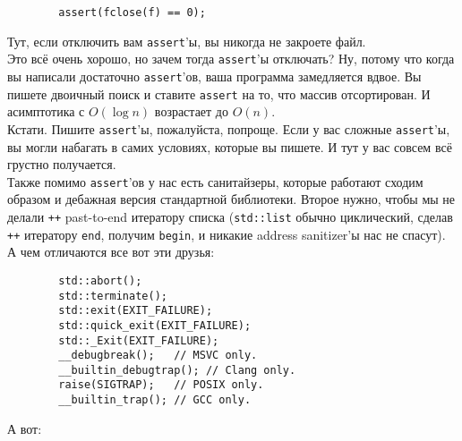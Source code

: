 \documentclass{article}
\begin{document}
    \begin{verbatim}
        assert(fclose(f) == 0);
    \end{verbatim}
    Тут, если отключить вам \texttt{assert}'ы, вы никогда не закроете файл.\\
    Это всё очень хорошо, но зачем тогда \texttt{assert}'ы отключать? Ну, потому что когда вы написали достаточно \texttt{assert}'ов, ваша программа замедляется вдвое. Вы пишете двоичный поиск и ставите \texttt{assert} на то, что массив отсортирован. И асимптотика с $O(\log n)$ возрастает до $O(n)$.\\
    Кстати. Пишите \texttt{assert}'ы, пожалуйста, попроще. Если у вас сложные \texttt{assert}'ы, вы могли набагать в самих условиях, которые вы пишете. И тут у вас совсем всё грустно получается.\\
    Также помимо \texttt{assert}'ов у нас есть санитайзеры, которые работают сходим образом и дебажная версия стандартной библиотеки. Второе нужно, чтобы мы не делали \texttt{++} past-to-end итератору списка (\texttt{std::list} обычно циклический, сделав \texttt{++} итератору \texttt{end}, получим \texttt{begin}, и никакие address sanitizer'ы нас не спасут).\\
    А чем отличаются все вот эти друзья:
    \begin{verbatim}
        std::abort();
        std::terminate();
        std::exit(EXIT_FAILURE);
        std::quick_exit(EXIT_FAILURE);
        std::_Exit(EXIT_FAILURE);
        __debugbreak();   // MSVC only.
        __builtin_debugtrap(); // Clang only.
        raise(SIGTRAP);   // POSIX only.
        __builtin_trap(); // GCC only.
    \end{verbatim}
    А вот:
\end{document}
